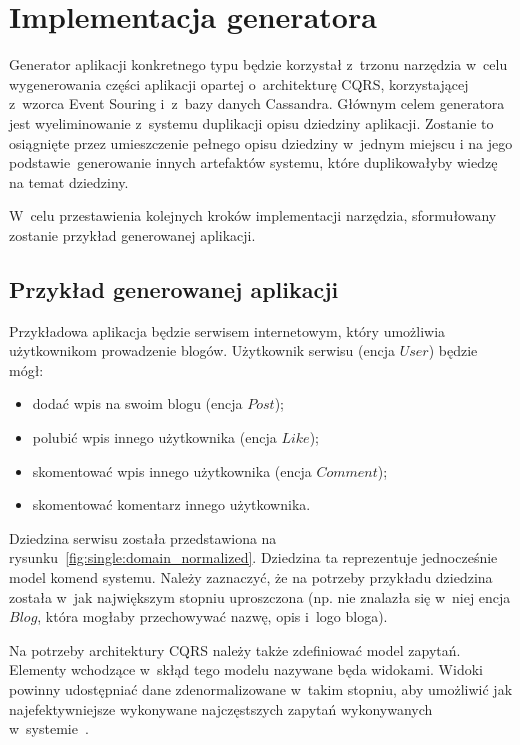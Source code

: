 \chapter{Implementacja generatora} \label{chap:implementation:single_type}

Generator aplikacji konkretnego typu będzie korzystał z~trzonu narzędzia w~celu wygenerowania części aplikacji opartej o~architekturę CQRS, korzystającej z~wzorca Event Souring i~z~bazy danych Cassandra.
Głównym celem generatora jest wyeliminowanie z~systemu duplikacji opisu dziedziny aplikacji.
Zostanie to osiągnięte przez umieszczenie pełnego opisu dziedziny w~jednym miejscu i na jego podstawie~generowanie innych artefaktów systemu, które duplikowałyby wiedzę na temat dziedziny.

W~celu przestawienia kolejnych kroków implementacji narzędzia, sformułowany zostanie przykład generowanej aplikacji.



\section{Przykład generowanej aplikacji}

Przykładowa aplikacja będzie serwisem internetowym, który umożliwia użytkownikom prowadzenie blogów.
Użytkownik serwisu (encja $User$) będzie mógł:

\begin{itemize}
 \item dodać wpis na swoim blogu (encja $Post$);
 \item polubić wpis innego użytkownika (encja $Like$);
 \item skomentować wpis innego użytkownika (encja $Comment$);
 \item skomentować komentarz innego użytkownika.
\end{itemize}

Dziedzina serwisu została przedstawiona na rysunku~\ref{fig:single:domain_normalized}.
Dziedzina ta reprezentuje jednocześnie model komend systemu.
Należy zaznaczyć, że na potrzeby przykładu dziedzina została w~jak największym stopniu uproszczona (np. nie znalazła się w~niej encja $Blog$, która mogłaby przechowywać nazwę, opis i~logo bloga).



Na potrzeby architektury CQRS należy także zdefiniować model zapytań.
Elementy wchodzące w~skłąd tego modelu nazywane będa widokami.
Widoki powinny udostępniać dane zdenormalizowane w~takim stopniu, aby umożliwić jak najefektywniejsze wykonywane najczęstszych zapytań wykonywanych w~systemie~\cite{cassandra_model}.

